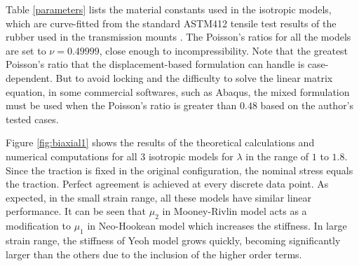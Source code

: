Table \ref{parameters} lists the material constants used in the isotropic models, which are curve-fitted from the standard ASTM412 tensile test results of the rubber used in the transmission mounts \cite{Sharma}. The Poisson's ratios for all the models are set to $\nu = 0.49999$, close enough to incompressibility. Note that the greatest Poisson's ratio that the displacement-based formulation can handle is case-dependent. But to avoid locking and the difficulty to solve the linear matrix equation, in some commercial softwares, such as Abaqus, the mixed formulation must be used when the Poisson's ratio is greater than $0.48$ based on the author's tested cases.

Figure \ref{fig:biaxial1} shows the results of the theoretical calculations and numerical computations for all $3$ isotropic models for $\lambda$ in the range of $1$ to $1.8$. Since the traction is fixed in the original configuration, the nominal stress equals the traction. Perfect agreement is achieved at every discrete data point. As expected, in the small strain range, all these models have similar linear performance. It can be seen that $\mu_2$ in Mooney-Rivlin model acts as a modification to $\mu_1$ in Neo-Hookean model which increases the stiffness. In large strain range, the stiffness of Yeoh model grows quickly, becoming significantly larger than the others due to the inclusion of the higher order terms.


